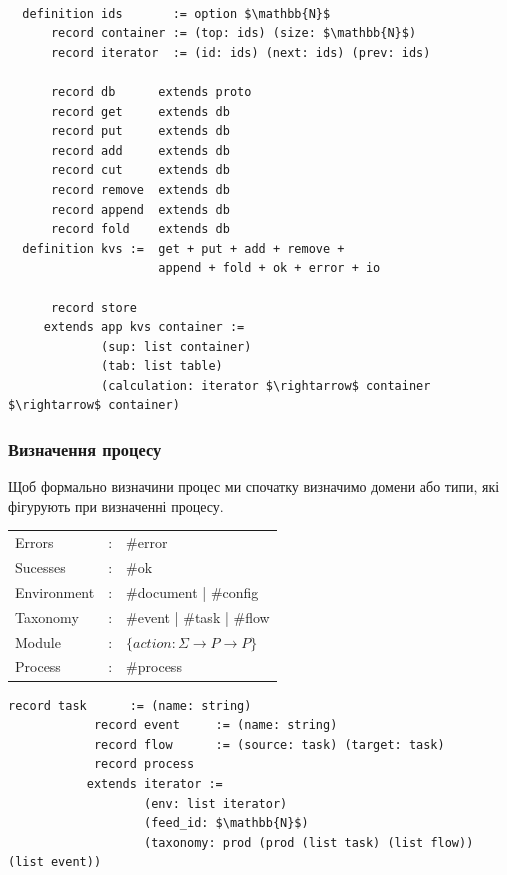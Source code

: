 \documentclass[11pt,oneside]{article}
\begin{document}
\begin{center}
\begin{lstlisting}[mathescape=true]

  definition ids       := option $\mathbb{N}$
      record container := (top: ids) (size: $\mathbb{N}$)
      record iterator  := (id: ids) (next: ids) (prev: ids)

      record db      extends proto
      record get     extends db
      record put     extends db
      record add     extends db
      record cut     extends db
      record remove  extends db
      record append  extends db
      record fold    extends db
  definition kvs :=  get + put + add + remove +
                     append + fold + ok + error + io

      record store
     extends app kvs container :=
             (sup: list container)
             (tab: list table)
             (calculation: iterator $\rightarrow$ container $\rightarrow$ container)

\end{lstlisting}
\end{center}

\newpage
   \subsubsection{Визначення процесу}

   Щоб формально визначини процес ми спочатку визначимо домени або типи,
   які фігурують при визначенні процесу.

\begin{center}
\begin{tabular}{lcl}
                Errors &:& \#error\\
              Sucesses &:& \#ok \\
           Environment &:& \#document | \#config\\
              Taxonomy &:& \#event    | \#task   | \#flow\\
                Module &:& $\{ action : \Sigma \rightarrow P \rightarrow P \}$ \\ \hline
               Process &:& \#process\\
\end{tabular}
\end{center}

\begin{center}
\begin{lstlisting}[mathescape=true]
            record task      := (name: string)
            record event     := (name: string)
            record flow      := (source: task) (target: task)
            record process
           extends iterator :=
                   (env: list iterator)
                   (feed_id: $\mathbb{N}$)
                   (taxonomy: prod (prod (list task) (list flow)) (list event))
\end{lstlisting}
\end{center}
\end{document}
